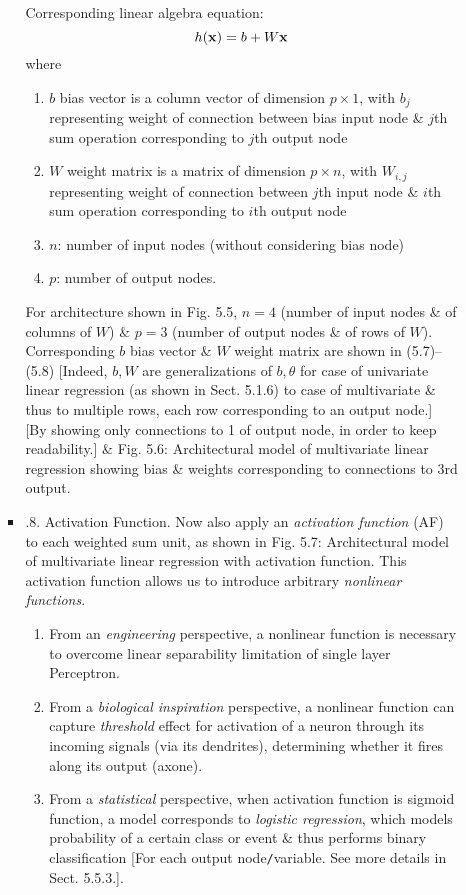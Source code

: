 \documentclass{article}
\begin{document}
\begin{itemize}
\begin{itemize}
\begin{itemize}
			Corresponding linear algebra equation:
			\begin{equation*}
				h({\bf x}) = b + W{\bf x}
			\end{equation*}
			where
			\begin{enumerate}
				\item $b$ bias vector is a column vector of dimension $p\times1$, with $b_j$ representing weight of connection between bias input node \& $j$th sum operation corresponding to $j$th output node
				\item $W$ weight matrix is a matrix of dimension $p\times n$, with $W_{i,j}$ representing weight of connection between $j$th input node \& $i$th sum operation corresponding to $i$th output node
				\item $n$: number of input nodes (without considering bias node)
				\item $p$: number of output nodes.
			\end{enumerate}
			For architecture shown in {\sf Fig. 5.5}, $n = 4$ (number of input nodes \& of columns of $W$) \& $p = 3$ (number of output nodes \& of rows of $W$). Corresponding $b$ bias vector \& $W$ weight matrix are shown in (5.7)--(5.8) [Indeed, $b,W$ are generalizations of $b,\theta$ for case of univariate linear regression (as shown in Sect. 5.1.6) to case of multivariate \& thus to multiple rows, each row corresponding to an output node.] [By showing only connections to 1 of output node, in order to keep readability.] \& {\sf Fig. 5.6: Architectural model of multivariate linear regression showing bias \& weights corresponding to connections to 3rd output.}
			\item {.8. Activation Function.} Now also apply an {\it activation function} (AF) to each weighted sum unit, as shown in {\sf Fig. 5.7: Architectural model of multivariate linear regression with activation function.} This activation function allows us to introduce arbitrary {\it nonlinear functions}.
			\begin{enumerate}
				\item From an {\it engineering} perspective, a nonlinear function is necessary to overcome linear separability limitation of single layer Perceptron.
				\item From a {\it biological inspiration} perspective, a nonlinear function can capture {\it threshold} effect for activation of a neuron through its incoming signals (via its dendrites), determining whether it fires along its output (axone).
				\item From a {\it statistical} perspective, when activation function is sigmoid function, a model corresponds to {\it logistic regression}, which models probability of a certain class or event \& thus performs binary classification [For each output node{\tt/}variable. See more details in Sect. 5.5.3.].

\end{enumerate}
\end{itemize}
\end{itemize}
\end{itemize}
\end{document}
